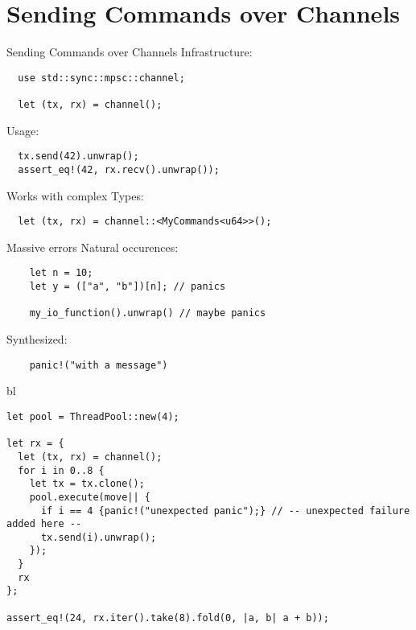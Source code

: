 \documentclass[aspectratio=1610,t]{beamer}
\begin{document}
{
\section{Sending Commands over Channels}
}

\begin{frame}[fragile]{Sending Commands over Channels}
  Infrastructure:
  \begin{verbatim}
  use std::sync::mpsc::channel;

  let (tx, rx) = channel();
  \end{verbatim}

\pause
  Usage:
  \begin{verbatim}
  tx.send(42).unwrap();
  assert_eq!(42, rx.recv().unwrap());
  \end{verbatim}

\pause
  Works with complex Types:
  \begin{verbatim}
  let (tx, rx) = channel::<MyCommands<u64>>();
  \end{verbatim}
\end{frame}



\begin{frame}[fragile]{Massive errors}
  Natural occurences:
  \begin{verbatim}
    let n = 10;
    let y = (["a", "b"])[n]; // panics

    my_io_function().unwrap() // maybe panics
  \end{verbatim}

\pause
  Synthesized:
  \begin{verbatim}
    panic!("with a message")
  \end{verbatim}
\end{frame}


\begin{frame}[fragile]{bl}
  \begin{verbatim}
let pool = ThreadPool::new(4);

let rx = {
  let (tx, rx) = channel();
  for i in 0..8 {
    let tx = tx.clone();
    pool.execute(move|| {
      if i == 4 {panic!("unexpected panic");} // -- unexpected failure added here --
      tx.send(i).unwrap();
    });
  }
  rx
};

assert_eq!(24, rx.iter().take(8).fold(0, |a, b| a + b));
  \end{verbatim}
\end{frame}
\end{document}
